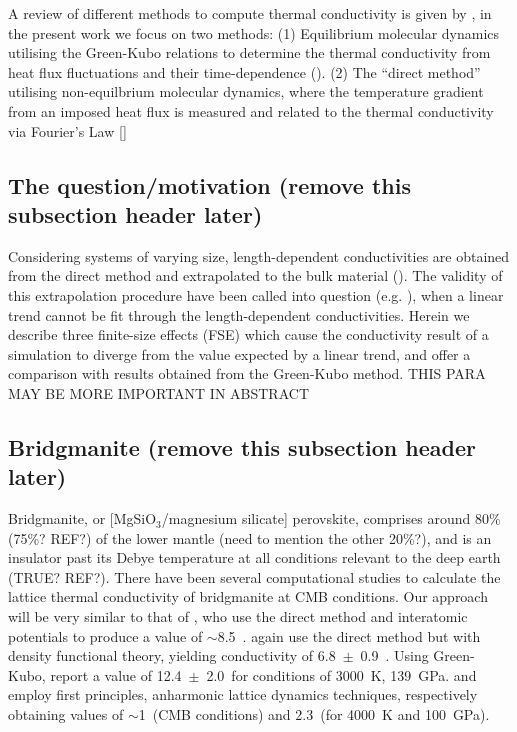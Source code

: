 \documentclass[%
preprint,                                  %
nofootinbib,
 amsmath,amssymb,
 aps,
]{revtex4-1}
\begin{document}
A review of different methods to compute thermal conductivity is given by \citet{Stackhouse2010}, in the present work we focus on two methods:
(1) Equilibrium molecular dynamics utilising the Green-Kubo relations to determine the thermal conductivity from heat flux fluctuations and their time-dependence (\citet{Green1954,Kubo1957,Kubo1966,Schelling2002}). 
(2) The ``direct method'' utilising non-equilbrium molecular dynamics, where the temperature gradient from an imposed heat flux is measured and related to the thermal conductivity via Fourier's Law [\citet{Muller-Plathe1997,Nieto-Draghi2013}]


\subsection{\label{sec:intro.question}The question/motivation (remove this subsection header later)}

Considering systems of varying size, length-dependent conductivities are obtained from the direct method and extrapolated to the bulk material (\citet{Schelling2002}). The validity of this extrapolation procedure have been called into question (e.g. \citet{Sellan2010}), when a linear trend cannot be fit through the length-dependent conductivities. Herein we describe three finite-size effects (FSE) which cause the conductivity result of a simulation to diverge from the value expected by a linear trend, and offer a comparison with results obtained from the Green-Kubo method. THIS PARA MAY BE MORE IMPORTANT IN ABSTRACT




\subsection{\label{sec:intro.brdg}Bridgmanite (remove this subsection header later)}

Bridgmanite, or [MgSiO$_3$/magnesium silicate] perovskite, comprises around 80\% (75\%? REF?) of the lower mantle (need to mention the other 20\%?), and is an insulator past its Debye temperature at all conditions relevant to the deep earth (TRUE? REF?). There have been several computational studies to calculate the lattice thermal conductivity of bridgmanite at CMB conditions.  
Our approach will be very similar to that of \citet{Ammann2014}, who use the direct method and interatomic potentials to produce a value of $\sim$8.5~\wmk. \citet{Stackhouse2015} again use the direct method but with density functional theory, yielding conductivity of 6.8~$\pm$~0.9~\wmk. Using Green-Kubo, \citet{Haigis2013} report a value of 12.4~$\pm$~2.0~\wmk for conditions of 3000~K, 139~GPa. \citet{Tang2014} and \citet{Dekura2013} employ first principles, anharmonic lattice dynamics techniques, respectively obtaining values of $\sim$1~\wmk (CMB conditions) and 2.3~\wmk (for 4000~K and 100~GPa).
\end{document}
